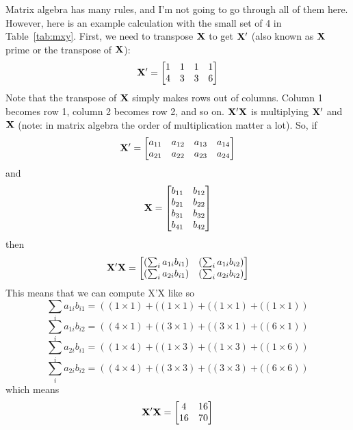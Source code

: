 Matrix algebra has many rules, and I'm not going to go through all of them here. However, here is an example calculation with the small set of 4 in Table~\ref{tab:mxy}. First, we need to transpose ${\bf X}$ to get ${\bf X'}$ (also known as ${\bf X}$ prime or the transpose of ${\bf X}$):
\[
{\bf X'} =
\begin{bmatrix}
1&1&1&1 \\
4&3&3&6 \\
\end{bmatrix}
\]
Note that the transpose of ${\bf X}$ simply makes rows out of columns. Column 1 becomes row 1, column 2 becomes row 2, and so on. ${\bf X'X}$ is multiplying ${\bf X'}$ and ${\bf X}$ (note: in matrix algebra the order of multiplication matter a lot). So, if
\[
{\bf X'} =
\begin{bmatrix}
a_{11}&a_{12}&a_{13}&a_{14} \\
a_{21}&a_{22}&a_{23}&a_{24} \\
\end{bmatrix}
\]
and
\[
{\bf X} =
\begin{bmatrix}
b_{11} & b_{12} \\
b_{21} & b_{22} \\
b_{31} & b_{32} \\
b_{41} & b_{42} \\
\end{bmatrix}
\]
then
\begin{equation}
{\bf X'X} =
\begin{bmatrix}
\left(\sum_ia_{1i}b_{i1}\right)&\left(\sum_ia_{1i}b_{i2}\right) \\
\left(\sum_ia_{2i}b_{i1}\right)&\left(\sum_ia_{2i}b_{i2}\right) \\
\end{bmatrix}
\end{equation}
This means that we can compute X'X like so
\[
\sum_ia_{1i}b_{i1} = \left(\left(1\times1\right)+(\left(1\times1\right)+(\left(1\times1\right)+(\left(1\times1\right)\right)
\]
\[
\sum_ia_{1i}b_{i2} = \left(\left(4\times1\right)+(\left(3\times1\right)+(\left(3\times1\right)+(\left(6\times1\right)\right)
\]
\[
\sum_ia_{2i}b_{i1} = \left(\left(1\times4\right)+(\left(1\times3\right)+(\left(1\times3\right)+(\left(1\times6\right)\right)
\]
\[
\sum_ia_{2i}b_{i2} = \left(\left(4\times4\right)+(\left(3\times3\right)+(\left(3\times3\right)+(\left(6\times6\right)\right)
\]
which means
\[
{\bf X'X} =
\begin{bmatrix}
4&16 \\
16&70 \\
\end{bmatrix}
\]
